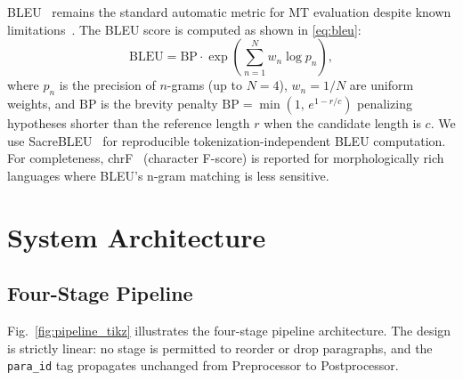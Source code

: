 \documentclass[conference]{IEEEtran}
\begin{document}
BLEU~\cite{papineni2002bleu} remains the standard automatic metric for MT evaluation
despite known limitations~\cite{callison2006re}.
The BLEU score is computed as shown in \eqref{eq:bleu}:
\begin{equation}
  \mathrm{BLEU} = \mathrm{BP} \cdot \exp\!\left(\sum_{n=1}^{N} w_n \log p_n\right),
  \label{eq:bleu}
\end{equation}
where $p_n$ is the precision of $n$-grams (up to $N=4$), $w_n = 1/N$ are uniform
weights, and $\mathrm{BP}$ is the brevity penalty
$\mathrm{BP} = \min\!\left(1,\, e^{1 - r/c}\right)$ penalizing hypotheses shorter
than the reference length $r$ when the candidate length is $c$.
We use SacreBLEU~\cite{post2018call} for reproducible tokenization-independent BLEU
computation.
For completeness, chrF~\cite{popovic2015chrf} (character F-score) is reported for
morphologically rich languages where BLEU's n-gram matching is less sensitive.

\section{System Architecture}

\subsection{Four-Stage Pipeline}

Fig.~\ref{fig:pipeline_tikz} illustrates the four-stage pipeline architecture.
The design is strictly linear: no stage is permitted to reorder or drop paragraphs,
and the \texttt{para\_id} tag propagates unchanged from Preprocessor to Postprocessor.
\end{document}
